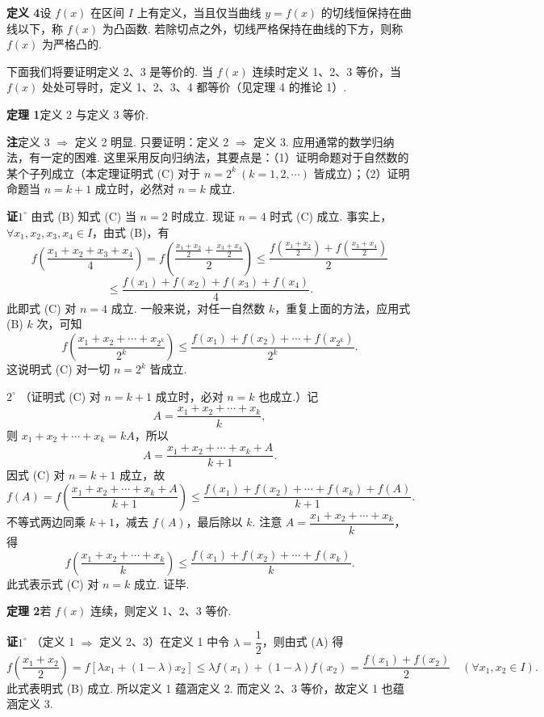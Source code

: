 \documentclass[UTF8, 12pt, fontset=fandol, oneside]{ctexart}
\begin{document}
\noindent\textbf{定义 4}\quad 设 $f(x)$ 在区间 $I$ 上有定义，当且仅当曲线 $y=f(x)$ 的切线恒保持在曲线以下，称 $f(x)$ 为凸函数. 若除切点之外，切线严格保持在曲线的下方，则称 $f(x)$ 为严格凸的.

下面我们将要证明定义 2、3 是等价的. 当 $f(x)$ 连续时定义 1、2、3 等价，当 $f(x)$ 处处可导时，定义 1、2、3、4 都等价（见定理 4 的推论 1）.

\noindent\textbf{定理 1}\quad 定义 2 与定义 3 等价.

\noindent\textbf{注}\quad 定义 3 $\Rightarrow$ 定义 2 明显. 只要证明：定义 2 $\Rightarrow$ 定义 3. 应用通常的数学归纳法，有一定的困难. 这里采用反向归纳法，其要点是：（1）证明命题对于自然数的某个子列成立（本定理证明式 (C) 对于 $n=2^k\ (k=1,2,\cdots)$ 皆成立）；（2）证明命题当 $n=k+1$ 成立时，必然对 $n=k$ 成立.

\noindent\textbf{证}\quad $1^\circ$ 由式 (B) 知式 (C) 当 $n=2$ 时成立. 现证 $n=4$ 时式 (C) 成立. 事实上，$\forall x_1,x_2,x_3,x_4\in I$，由式 (B)，有
\[
  f\left(\frac{x_1+x_2+x_3+x_4}{4}\right)
  =f\left(\frac{\frac{x_1+x_2}{2}+\frac{x_3+x_4}{2}}2\right)
  \le\frac{f\left(\frac{x_1+x_2}{2}\right)+f\left(\frac{x_3+x_4}{2}\right)}2
\]
\[
  \le\frac{f(x_1)+f(x_2)+f(x_3)+f(x_4)}4.
\]
此即式 (C) 对 $n=4$ 成立. 一般来说，对任一自然数 $k$，重复上面的方法，应用式 (B) $k$ 次，可知
\[
  f\left(\frac{x_1+x_2+\cdots+x_{2^k}}{2^k}\right)
  \le\frac{f(x_1)+f(x_2)+\cdots+f(x_{2^k})}{2^k}.
\]
这说明式 (C) 对一切 $n=2^k$ 皆成立.

$2^\circ$ （证明式 (C) 对 $n=k+1$ 成立时，必对 $n=k$ 也成立.）记
\[
  A=\frac{x_1+x_2+\cdots+x_k}{k},
\]
则 $x_1+x_2+\cdots+x_k=kA$，所以
\[
  A=\frac{x_1+x_2+\cdots+x_k+A}{k+1}.
\]
因式 (C) 对 $n=k+1$ 成立，故
\[
  f(A)=f\left(\frac{x_1+x_2+\cdots+x_k+A}{k+1}\right)
  \le\frac{f(x_1)+f(x_2)+\cdots+f(x_k)+f(A)}{k+1}.
\]
不等式两边同乘 $k+1$，减去 $f(A)$，最后除以 $k$. 注意 $A=\dfrac{x_1+x_2+\cdots+x_k}{k}$，得
\[
  f\left(\frac{x_1+x_2+\cdots+x_k}{k}\right)
  \le\frac{f(x_1)+f(x_2)+\cdots+f(x_k)}{k}.
\]
此式表示式 (C) 对 $n=k$ 成立. 证毕.

\noindent\textbf{定理 2}\quad 若 $f(x)$ 连续，则定义 1、2、3 等价.

\noindent\textbf{证}\quad $1^\circ$ （定义 1 $\Rightarrow$ 定义 2、3）在定义 1 中令 $\lambda=\dfrac12$，则由式 (A) 得
\[
  f\left(\frac{x_1+x_2}{2}\right)
  =f[\lambda x_1+(1-\lambda)x_2]
  \le\lambda f(x_1)+(1-\lambda)f(x_2)
  =\frac{f(x_1)+f(x_2)}2\quad(\forall x_1,x_2\in I).
\]
此式表明式 (B) 成立. 所以定义 1 蕴涵定义 2. 而定义 2、3 等价，故定义 1 也蕴涵定义 3.
\end{document}
